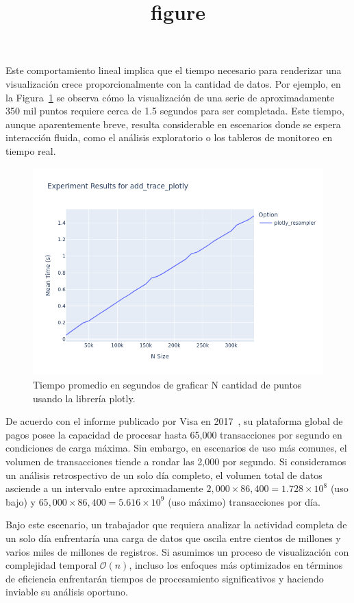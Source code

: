 Este comportamiento lineal implica que el tiempo necesario para renderizar una visualización crece proporcionalmente con la cantidad de datos. Por ejemplo, en la Figura~\ref{add_trace_plotly} se observa cómo la visualización de una serie de aproximadamente 350 mil puntos requiere cerca de 1.5 segundos para ser completada. Este tiempo, aunque aparentemente breve, resulta considerable en escenarios donde se espera interacción fluida, como el análisis exploratorio o los tableros de monitoreo en tiempo real.

\begin{figure}
    \centering
    \includegraphics[width=0.9\linewidth]{introduction/images/add_trace_plotly.png}
    \title{figure}
    \caption{Tiempo promedio en segundos de graficar N cantidad de puntos usando la librería plotly.}
    \label{add_trace_plotly}
\end{figure}

De acuerdo con el informe publicado por Visa en 2017~\cite{visa2017facts}, su plataforma global de pagos posee la capacidad de procesar hasta 65{,}000 transacciones por segundo en condiciones de carga máxima. Sin embargo, en escenarios de uso más comunes, el volumen de transacciones tiende a rondar las 2{,}000 por segundo. Si consideramos un análisis retrospectivo de un solo día completo, el volumen total de datos asciende a un intervalo entre aproximadamente \(2{,}000 \times 86{,}400 = 1.728 \times 10^8\) (uso bajo) y \(65{,}000 \times 86{,}400 = 5.616 \times 10^9\) (uso máximo) transacciones por día.

Bajo este escenario, un trabajador que requiera analizar la actividad completa de un solo día enfrentaría una carga de datos que oscila entre cientos de millones y varios miles de millones de registros. Si asumimos un proceso de visualización con complejidad temporal \(\mathcal{O}(n)\), incluso los enfoques más optimizados en términos de eficiencia enfrentarán tiempos de procesamiento significativos y haciendo inviable su análisis oportuno.

